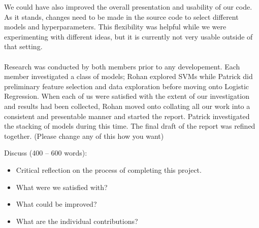 \documentclass[11pt]{article}
\newcommand{\drafting}[1]{\textcolor{OliveGreen}{#1}}
\begin{document}
We could have also improved the overall presentation and usability of our code. As it stands, changes need to be made in the source code to select different models and hyperparameters. This flexibility was helpful while we were experimenting with different ideas, but it is currently not very usable outside of that setting.
\\
\\
\drafting{
Research was conducted by both members prior to any developement. Each member investigated a class of models; Rohan explored SVMs while Patrick did preliminary feature selection and data exploration before moving onto Logistic Regression.
When each of us were satisfied with the extent of our investigation and results had been collected, Rohan moved onto collating all our work into a consistent and presentable manner and started the report. Patrick investigated the stacking of models during this time. The final draft of the report was refined together. (Please change any of this how you want)
}
\\

\drafting{ Discuss (400 -- 600 words):
\begin{itemize}
    \item Critical reflection on the process of completing this project.
    \item What were we satisfied with?
    \item What could be improved?
    \item What are the individual contributions?
\end{itemize}
}
\end{document}
